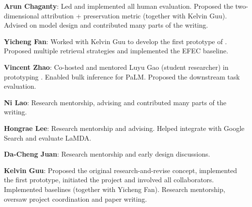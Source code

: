 \textbf{Arun Chaganty}: Led and implemented all human evaluation. Proposed the two-dimensional attribution + preservation metric (together with Kelvin Guu). Advised on model design and contributed many parts of the writing.

\textbf{Yicheng Fan}: Worked with Kelvin Guu to develop the first prototype of \approach{}. Proposed multiple retrieval strategies and implemented the EFEC baseline.

\textbf{Vincent Zhao}: Co-hosted and mentored Luyu Gao (student researcher) in prototyping \approach{}. Enabled bulk inference for PaLM. Proposed the downstream task evaluation.

\textbf{Ni Lao}: Research mentorship, advising and contributed many parts of the writing.

\textbf{Hongrae Lee}: Research mentorship and advising. Helped integrate \approach{} with Google Search and evaluate LaMDA.

\textbf{Da-Cheng Juan}: Research mentorship and early design discussions.

\textbf{Kelvin Guu}: Proposed the original research-and-revise concept, implemented the first prototype, initiated the project and involved all collaborators. Implemented baselines (together with Yicheng Fan). Research mentorship, oversaw project coordination and paper writing.

